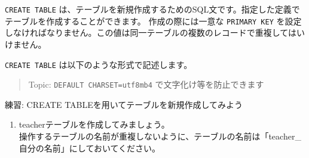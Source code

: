 \texttt{CREATE\ TABLE}
は、テーブルを新規作成するためのSQL文です。指定した定義でテーブルを作成することができます。
作成の際には一意な \texttt{PRIMARY\ KEY}
を設定しなければなりません。この値は同一テーブルの複数のレコードで重複してはいけません。

\texttt{CREATE\ TABLE} は以下のような形式で記述します。

\begin{quote}
Topic: \texttt{DEFAULT\ CHARSET=utf8mb4} で文字化け等を防止できます
\end{quote}

\begin{Shaded}
\begin{Highlighting}[]
 
\NormalTok{) }\OperatorTok{=}

 
       
  \NormalTok{,}
\NormalTok{(}\NormalTok{) } \NormalTok{,}
 \NormalTok{,}
 \NormalTok{,}
     \NormalTok{ (}\NormalTok{)}
\NormalTok{) }\OperatorTok{=}
\end{Highlighting}
\end{Shaded}

練習: CREATE TABLEを用いてテーブルを新規作成してみよう

\begin{enumerate}
\def\labelenumi{\arabic{enumi}.}
\tightlist
\item
  teacherテーブルを作成してみましょう。\\
  操作するテーブルの名前が重複しないように、テーブルの名前は「teacher\_自分の名前」にしておいてください。
\end{enumerate}

